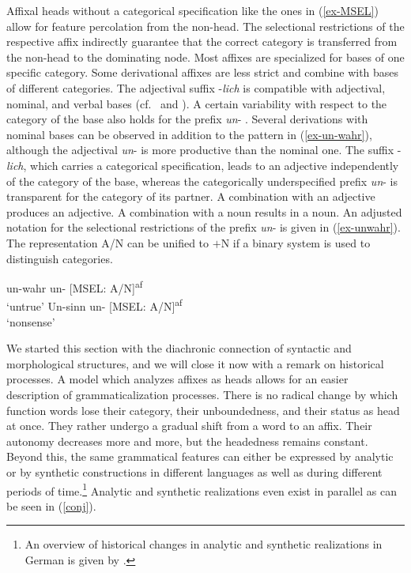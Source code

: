 \documentclass[output=paper
  ,nobabel
  ,draftmode
  ,colorlinks, citecolor=brown
]{langscibook}
\begin{document}
\noindent Affixal heads without a categorical specification like the ones in (\ref{ex-MSEL}) allow for feature percolation from the non-head. The selectional restrictions of the respective affix indirectly guarantee that the correct category is transferred from the non-head to the dominating node. Most affixes are specialized for bases of one specific category. Some derivational affixes are less strict and combine with bases of different categories. The adjectival suffix -\emph{lich} is compatible with adjectival, nominal, and verbal bases (cf.\ \cite[260--263]{FleischerBarz1995} and \cite[141--142]{AltmannKemmerling2000}). A certain variability with respect to the category of the base also holds for the prefix \emph{un}- \citep[cf.][]{Schnerrer1982}. Several derivations with nominal bases can be observed in addition to the pattern in (\ref{ex-un-wahr}), although the adjectival \emph{un}- is more productive than the nominal one. The suffix -\emph{lich}, which carries a categorical specification, leads to an adjective independently of the category of the base, whereas the categorically underspecified prefix \emph{un}{}- is transparent for the category of its partner. A combination with an adjective produces an adjective. A combination with a noun results in a noun. An adjusted notation for the selectional restrictions of the prefix \emph{un}{}- is given in (\ref{ex-unwahr}). The representation A/N can be unified to $+$N if a binary system is used to distinguish categories.

\eal
\label{ex-unwahr}
\ex un-wahr \hspace{10pt} un- [MSEL: A/N]\textsuperscript{af}\\`untrue' 
\ex Un-sinn \hspace{11.5pt} un- [MSEL: A/N]\textsuperscript{af}\\`nonsense'
\zl

\noindent 
We started this section with the diachronic connection of syntactic and morphological structures, and we will close it now with a remark on historical processes. A model which analyzes affixes as heads allows for an easier description of grammaticalization processes. There is no radical change by which function words lose their category, their unboundedness, and their status as head at once. They rather undergo a gradual shift from a word to an affix. Their autonomy decreases more and more, but the headedness remains constant. Beyond this, the same grammatical features can either be expressed by analytic or by synthetic constructions in different languages as well as during different periods of time.\footnote{An overview of historical changes in analytic and synthetic realizations in German is given by \citet[Section~11]{NueblingEtAl2010}.} Analytic and synthetic realizations even exist in parallel as can be seen in (\ref{conj}).
\end{document}
